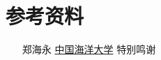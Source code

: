 \documentclass[a4paper，12pt]{article}
\begin{document}
\section{参考资料}

\begin{itemize}
\item[郑海永]\href{http://vision.ouc.edu.cn/~zhenghaiyong/}{中国海洋大学} 特别鸣谢
\end{itemize}
\end{document}
